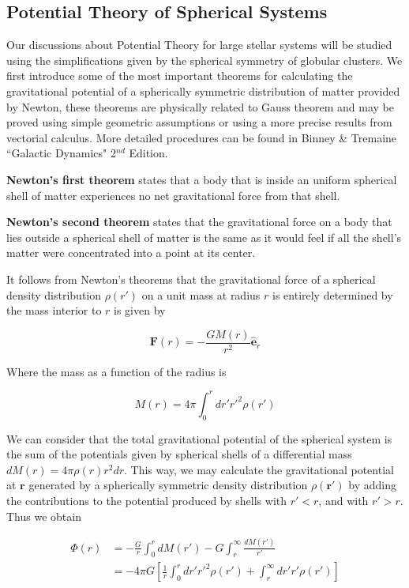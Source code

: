 \subsection{Potential Theory of Spherical Systems}

Our discussions about Potential Theory for large stellar systems will be studied using the simplifications given by the spherical symmetry of globular clusters. We first introduce some of the most important theorems for calculating the gravitational potential of a spherically symmetric distribution of matter provided by Newton, these theorems are physically related to Gauss theorem and may be proved using simple geometric assumptions or using a more precise results from vectorial calculus. More detailed procedures can be found in Binney \& Tremaine ``Galactic Dynamics" 2$^{nd}$ Edition.

\textbf{Newton's first theorem} states that a body that is inside an uniform spherical shell of matter experiences no net gravitational force from that shell. 

\textbf{Newton's second theorem} states that the gravitational force on a body that lies outside a spherical shell of matter is the same as it would feel if all the shell's matter were concentrated into a point at its center. 

It follows from Newton's theorems that the gravitational force of a spherical density distribution $\rho(r')$ on a unit mass at radius $r$ is entirely determined by the mass interior to $r$ is given by

\begin{equation}
\textbf{F}(r)=-\frac{GM(r)}{r^{2}}\hat{\textbf{e}}_{r}
\end{equation}

Where the mass as a function of the radius is

\begin{equation}
M(r)=4\pi\int_{0}^{r}dr'r'^{2}\rho(r')
\end{equation}

We can consider that the total gravitational potential of the spherical system is the sum of the potentials given by spherical shells of a differential mass $dM(r)=4\pi\rho(r)r^{2}dr$. This way, we may calculate the gravitational potential at $\textbf{r}$ generated by a spherically symmetric density distribution $\rho(\textbf{r}')$ by adding the contributions to the potential produced by shells with $r'<r$, and with $r'>r$. Thus we obtain

\begin{equation}
	\begin{aligned}	
	\Phi(r) &= -\frac{G}{r}\int_{0}^{r}dM(r')-G\int_{r}^{\infty}\frac{dM(r')} {r'}\\      &= -4\pi G\left[\frac{1}{r}\int_{0}^{r}dr'r'^{2}\rho(r')+\int_{r}^{\infty}dr'r'\rho(r')\right]
	\end{aligned}
\end{equation} 

